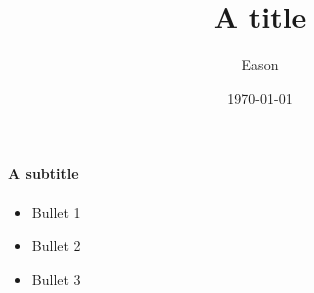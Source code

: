 \documentclass[koma,a4paper,utopia,12pt,listings-color,microtype,paralist,colorlinks,urlcolor=red]{org-article}
\author{Eason}
\date{\today}
\title{A title}
\institute[INST]{Institute\\\url{http://www.institute.edu}}
\begin{document}
\framesubtitle{A subtitle}

\begin{itemize}
\item Bullet 1
\item Bullet 2
\item Bullet 3
\end{itemize}
\end{document}
